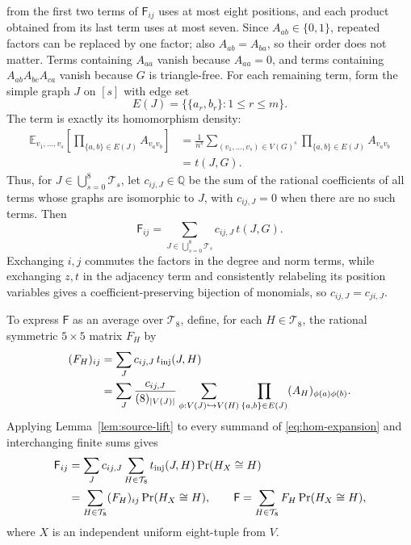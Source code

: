 \documentclass[11pt]{article}
\newcommand{\E}{\mathbb E}
\begin{document}
from the first two terms of $\mathsf F_{ij}$ uses at most eight positions,
and each product obtained from its last term uses at most seven.
Since $A_{ab}\in\{0,1\}$, repeated factors can be replaced by one factor;
also $A_{ab}=A_{ba}$, so their order does not matter.
Terms containing $A_{aa}$ vanish because $A_{aa}=0$, and terms containing
$A_{ab}A_{bc}A_{ca}$ vanish because $G$ is triangle-free.
For each remaining term, form the simple graph $J$ on $[s]$ with edge set
\[
E(J)=\{\{a_r,b_r\}:1\leq r\leq m\}.
\]
The term is exactly its homomorphism density:
\[
\begin{aligned}
\E_{v_1,\ldots,v_s}
\left[\prod_{\{a,b\}\in E(J)}A_{v_av_b}\right]
&=\frac1{n^s}\sum_{(v_1,\ldots,v_s)\in V(G)^s}
\prod_{\{a,b\}\in E(J)}A_{v_av_b}\\
&=t(J,G).
\end{aligned}
\]
Thus, for $J\in\bigcup_{s=0}^8\mathcal T_s$, let $c_{ij,J}\in\mathbb Q$
be the sum of the rational coefficients of all terms whose graphs are
isomorphic to $J$, with $c_{ij,J}=0$ when there are no such terms. Then
\begin{equation}\label{eq:hom-expansion}
\mathsf F_{ij}=\sum_{J\in\bigcup_{s=0}^8\mathcal T_s}c_{ij,J}\,t(J,G).
\end{equation}
Exchanging $i,j$ commutes the factors in the degree and norm terms, while exchanging $z,t$ in the adjacency term and consistently relabeling its position variables gives a coefficient-preserving bijection of monomials, so $c_{ij,J}=c_{ji,J}$.

To express $\mathsf F$ as an average over $\mathcal T_8$, define, for each
$H\in\mathcal T_8$, the rational symmetric $5\times5$ matrix $F_H$ by
\begin{align}
(F_H)_{ij}
&=\sum_Jc_{ij,J}\,t_{\mathrm{inj}}(J,H)\notag\\
&=\sum_J\frac{c_{ij,J}}{(8)_{|V(J)|}}
\sum_{\phi:V(J)\hookrightarrow V(H)}
\prod_{\{a,b\}\in E(J)}(A_H)_{\phi(a)\phi(b)}.
\label{eq:FH}
\end{align}
Applying Lemma~\ref{lem:source-lift} to every summand of \eqref{eq:hom-expansion} and interchanging finite sums gives
\begin{align}
\mathsf F_{ij}
&=\sum_Jc_{ij,J}\sum_{H\in\mathcal T_8}
t_{\mathrm{inj}}(J,H)\Pr(H_X\cong H)\notag\\
&=\sum_{H\in\mathcal T_8}(F_H)_{ij}\Pr(H_X\cong H),
\qquad
\mathsf F=\sum_{H\in\mathcal T_8}F_H\Pr(H_X\cong H),
\label{eq:F-source-lift}
\end{align}
where $X$ is an independent uniform eight-tuple from $V$.
\end{document}
